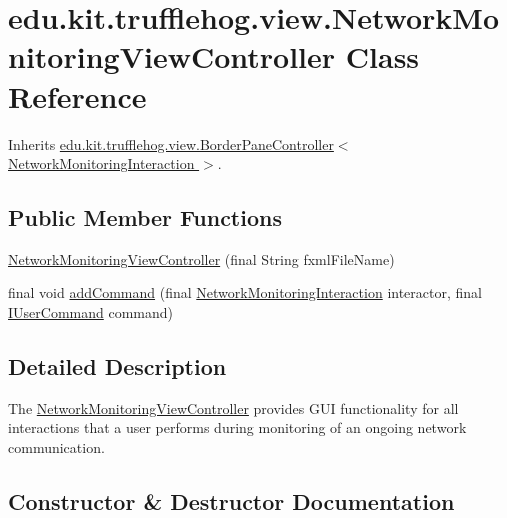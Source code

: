 \hypertarget{classedu_1_1kit_1_1trufflehog_1_1view_1_1_network_monitoring_view_controller}{}\section{edu.\+kit.\+trufflehog.\+view.\+Network\+Monitoring\+View\+Controller Class Reference}
\label{classedu_1_1kit_1_1trufflehog_1_1view_1_1_network_monitoring_view_controller}


Inherits \hyperlink{classedu_1_1kit_1_1trufflehog_1_1view_1_1_border_pane_controller}{edu.\+kit.\+trufflehog.\+view.\+Border\+Pane\+Controller$<$ Network\+Monitoring\+Interaction $>$}.

\subsection*{Public Member Functions}
\begin{DoxyCompactItemize}
\item 
\hyperlink{classedu_1_1kit_1_1trufflehog_1_1view_1_1_network_monitoring_view_controller_a60079fc477e1d4ea54d08196ccc1d569}{Network\+Monitoring\+View\+Controller} (final String fxml\+File\+Name)
\item 
final void \hyperlink{classedu_1_1kit_1_1trufflehog_1_1view_1_1_network_monitoring_view_controller_a6cd7902e7450c1edcae98a4b13025278}{add\+Command} (final \hyperlink{enumedu_1_1kit_1_1trufflehog_1_1interaction_1_1_network_monitoring_interaction}{Network\+Monitoring\+Interaction} interactor, final \hyperlink{interfaceedu_1_1kit_1_1trufflehog_1_1command_1_1usercommand_1_1_i_user_command}{I\+User\+Command} command)
\end{DoxyCompactItemize}


\subsection{Detailed Description}
The \hyperlink{classedu_1_1kit_1_1trufflehog_1_1view_1_1_network_monitoring_view_controller}{Network\+Monitoring\+View\+Controller} provides G\+U\+I functionality for all interactions that a user performs during monitoring of an ongoing network communication. 

\subsection{Constructor \& Destructor Documentation}
\hypertarget{classedu_1_1kit_1_1trufflehog_1_1view_1_1_network_monitoring_view_controller_a60079fc477e1d4ea54d08196ccc1d569}{}
